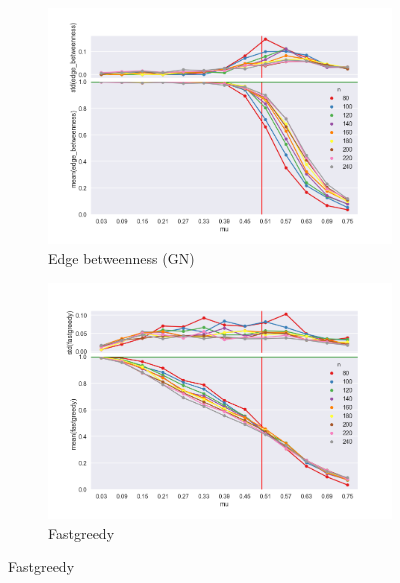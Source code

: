 \begin{figure}
  \centering

    \begin{subfigure}[b]{0.32\textwidth}
        \includegraphics[width=\textwidth]{fig/ami_vs_mu_edge_betweenness}
        \caption{Edge betweenness (GN)}
        \label{fig:gull}
    \end{subfigure}
    \qquad
    \begin{subfigure}[b]{0.32\textwidth}
        \includegraphics[width=\textwidth]{fig/ami_vs_mu_fastgreedy}
        \caption{Fastgreedy}
        \label{fig:tiger}
    \end{subfigure}
    

\end{figure}
